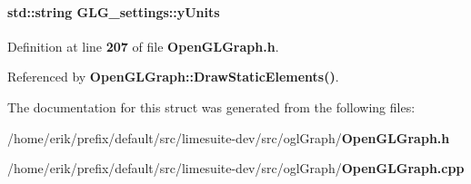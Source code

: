 \paragraph[{y\+Units}]{\setlength{\rightskip}{0pt plus 5cm}std\+::string G\+L\+G\+\_\+settings\+::y\+Units}\label{structGLG__settings_aa83a8ff7a5c73c8fe60899a08cc279ad}


Definition at line {\bf 207} of file {\bf Open\+G\+L\+Graph.\+h}.



Referenced by {\bf Open\+G\+L\+Graph\+::\+Draw\+Static\+Elements()}.



The documentation for this struct was generated from the following files\+:\begin{DoxyCompactItemize}
\item 
/home/erik/prefix/default/src/limesuite-\/dev/src/ogl\+Graph/{\bf Open\+G\+L\+Graph.\+h}\item 
/home/erik/prefix/default/src/limesuite-\/dev/src/ogl\+Graph/{\bf Open\+G\+L\+Graph.\+cpp}\end{DoxyCompactItemize}
